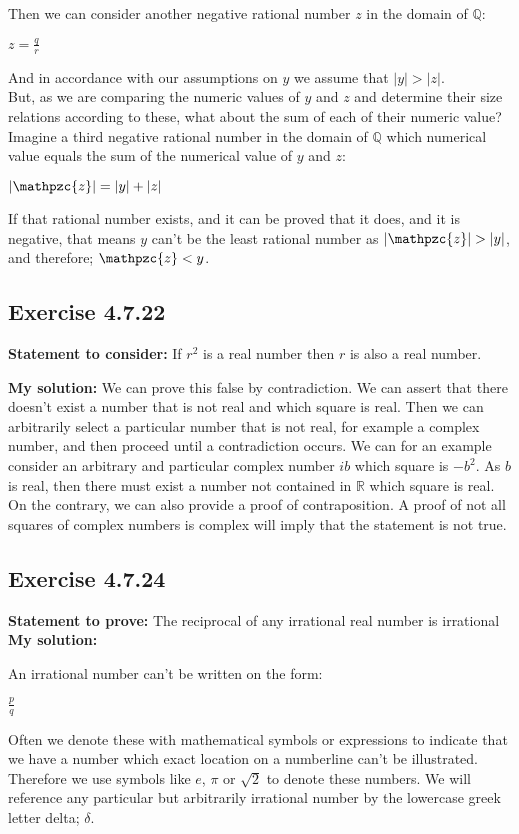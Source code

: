\documentclass{report}
\newcommand{\cent}[1]{\begin{center}#1\end{center}}
\newcommand{\doubleR}{\mathbb{R}}
\newcommand{\doubleQ}{\mathbb{Q}}
\newcommand{\script}[1]{\mathpzc{#1}}
\newcommand{\Prove}{\textbf{Statement to prove: }}
\newcommand{\assignmentDescription}{\textbf{Statement to consider: }}
\newcommand{\solution}{\textbf{My solution: }}
\newcommand{\QED}{\boxed{}}
\newcommand{\Exercise}[1]{\subsection{Exercise #1}}
\begin{document}
	Then we can consider another negative rational number $z$ in the domain of $\doubleQ$:
	
	\cent{$z = \frac{q}{r}$}
	
	And in accordance with our assumptions on $y$ we assume that $|y| > |z|$.\\
	
	But, as we are comparing the numeric values of $y$ and $z$ and determine their size relations according to these, what about the sum of each of their numeric value?\\
	
	Imagine a third negative rational number in the domain of $\doubleQ$ which numerical value equals the sum of the numerical value of $y$ and $z$:
	
	\cent{$|\script{z}| = |y| + |z|$}
	
	If that rational number exists, and it can be proved that it does, and it is negative, that means $y$ can't be the least rational number as $|\script{z}| > |y|$, and therefore; $\script{z} < y$.\\
	\QED
	
	\Exercise{4.7.22}
	
	\assignmentDescription
	If $r^2$ is a real number then $r$ is also a real number.
	
	\solution
	We can prove this false by contradiction. We can assert that there doesn't exist a number that is not real and which square is real. Then we can arbitrarily select a particular number that is not real, for example a complex number, and then proceed until a contradiction occurs. We can for an example consider an arbitrary and particular complex number $ib$ which square is $-b^2$. As $b$ is real, then there must exist a number not contained in $\doubleR$ which square is real.\\
	
	On the contrary, we can also provide a proof of contraposition. A proof of not all squares of complex numbers is complex will imply that the statement is not true.\\
	
	\Exercise{4.7.24}
	
	\Prove
	The reciprocal of any irrational real number is irrational\\
	
	\solution
	
	An irrational number can't be written on the form:
	
	\cent{$\frac{p}{q}$}
	
	Often we denote these with mathematical symbols or expressions to indicate that we have a number which exact location on a numberline can't be illustrated. Therefore we use symbols like $e$, $\pi$ or $\sqrt{2}$ to denote these numbers. We will reference any particular but arbitrarily irrational number by the lowercase greek letter delta; $\delta$.\\
	
\end{document}
